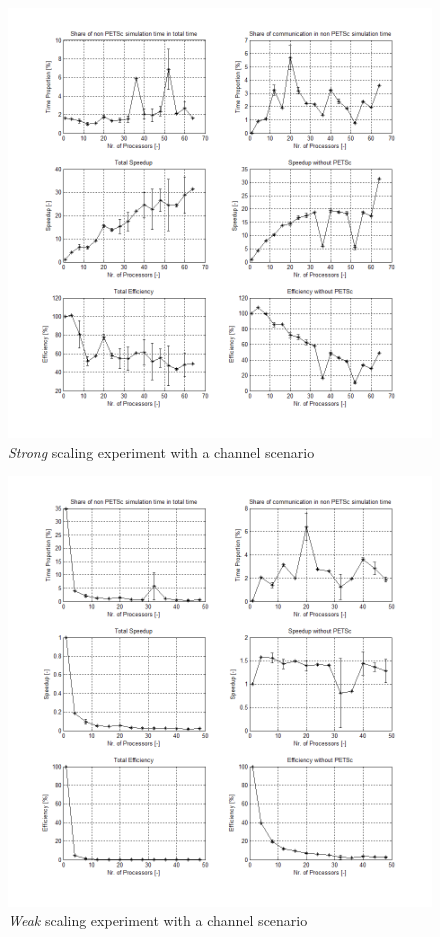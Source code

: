 \documentclass[11pt,a4paper]{article}
\begin{document}
\begin{figure}[h]
  \centering
  \includegraphics[width=\textwidth]{scaling/channel-strong}
  \caption{\emph{Strong} scaling experiment with a channel scenario}
  \label{fig:scaling-channel-strong}
\end{figure}

\begin{figure}[h]
  \centering
  \includegraphics[width=\textwidth]{scaling/channel-weak}
  \caption{\emph{Weak} scaling experiment with a channel scenario}
  \label{fig:scaling-channel-weak}
\end{figure}
\end{document}

